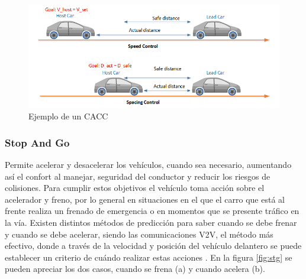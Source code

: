 \begin{figure}[!h]
	\centering
		\includegraphics[scale=0.7]{Imagenes/acc2}
		\caption[Ejemplo de un CACC]{Ejemplo de un CACC \protect\footnotemark}
		\label{fig:acc2}
	\end{figure}	


\subsubsection{Stop And Go}

Permite acelerar y desacelerar los vehículos, cuando sea necesario, aumentando así el confort al manejar, seguridad del conductor y reducir los riesgos de colisiones. Para cumplir estos objetivos el vehículo toma acción sobre el acelerador y freno, por lo general en situaciones en el que el carro que está al frente realiza un frenado de emergencia o en momentos que se presente tráfico en la vía. Existen distintos métodos de predicción para saber cuando se debe frenar y cuando se debe acelerar, siendo las comunicaciones V2V, el método más efectivo, donde a través de la velocidad y posición del vehículo delantero se puede establecer un criterio de cuándo realizar estas acciones \cite{marzbanrad2015prediction}. En la figura \ref{fig:stg} se pueden apreciar los dos casos, cuando se frena (a) y cuando acelera (b).\\

